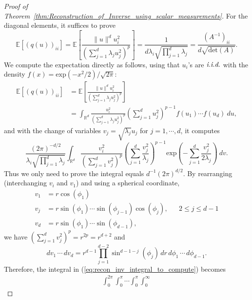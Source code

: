 \begin{proof}[Proof of Theorem~\ref{thm:Reconstruction_of_Inverse_using_scalar_measurements}]
    For the diagonal elements, it suffices to prove
    \begin{equation} \label{eq:recon_inv_to_prove}
        \mathbb{E}[(q(u))_{ii}] = \mathbb{E}\left[\frac{\|u\|^{d}u_i^2}{(\sum_{j=1}^{d}\lambda_j u_j^2)^p}\right]
        = \frac{1}{d \lambda_i \sqrt{\prod_{j=1}^d \lambda_j}} = \frac{(A^{-1})_{ii}}{d \sqrt{\mathrm{det}(A)}}.
    \end{equation}
    We compute the expectation directly as follows, using that $u_i$'s are $\emph{i.i.d.}$ with the density $f(x) = \mathrm{exp}(-x^2/2)/\sqrt{2\pi}$:
    \begin{align*}
        \mathbb{E}[(q(u))_{ii}]
         & =  \mathbb{E}\left[\frac{\|u\|^{d}u_i^2}{(\sum_{j=1}^{d}\lambda_j u_j^2)^p}\right]                                                  \\
         & = \int_{\mathbb{R}^d} \frac{u_i^2}{\left(\sum_{j=1}^{d}\lambda_j u_j^2\right)^p} {\left(\sum_{j=1}^{d} u_j^2\right)^{p-1}} f(u_1)\cdots f(u_d)~du, %
    \end{align*}
    and with the change of variables $v_j = \sqrt{\lambda_j}u_j$ for $j=1,\cdots,d$, it computes
    \begin{equation} \label{eq:recon_inv_integral_to_compute}
        \frac{(2\pi)^{-d/2}}{\lambda_i \sqrt{\prod_{j=1}^d \lambda_j}} \int_{\mathbb{R}^d}{\frac{v_i^2}{\left(\sum_{j=1}^{d}v_j^2\right)^p}{\left(\sum_{j=1}^{d} \frac{v_j^2}{\lambda_j}\right)^{p-1}} \mathrm{exp}(-\sum_{j=1}^{d} \frac{v_j^2}{2\lambda_j})~dv.} %
    \end{equation}
    Thus we only need to prove the integral equals $d^{-1}(2\pi)^{d/2}$.
    By rearranging (interchanging $v_i$ and $v_1$) and using a spherical coordinate,
    \begin{align*}
        v_1 & = r\cos (\phi_1)                                                                \\
        v_j & = r\sin (\phi_1) \cdots \sin (\phi_{j-1}) \cos (\phi_j), &  & 2 \leq j \leq d-1 \\
        v_d & = r \sin(\phi_1) \cdots \sin(\phi_{d-1}),
    \end{align*}
    we have $\left(\sum_{j=1}^{d}v_j^2\right)^p = r^{2p} = r^{d+2}$ and
    \[
        dv_1\,\cdots \,dv_d = r^{d-1} \prod_{j=1}^{d-2} \sin^{d-1-j}(\phi_j) \,dr\,d\phi_1 \,\cdots\, d\phi_{d-1}.
    \]
    Therefore, the integral in (\ref{eq:recon_inv_integral_to_compute}) becomes
    \begin{align*}
        \int_0^{2\pi}\int_0^{\pi}\cdots \int_0^{\pi}\int_{0}^{\infty}

\end{align*}
\end{proof}
